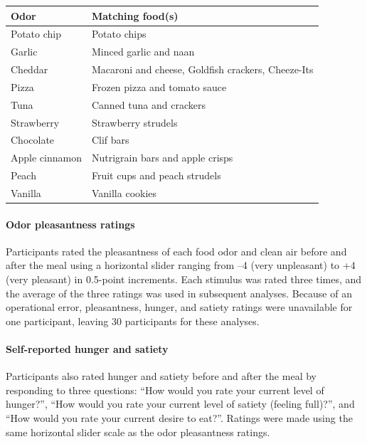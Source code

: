 \documentclass[12pt,letterpaper]{article}
\begin{document}
\label{tab:odor-food-mapping}
\small\setlength{\tabcolsep}{4pt}\begin{tabular}{p{}p{}}
\hline
\textbf{Odor} & \textbf{Matching food(s)} \\
\hline
Potato chip & Potato chips \\
Garlic & Minced garlic and naan \\
Cheddar & Macaroni and cheese, Goldfish crackers, Cheeze-Its \\
Pizza & Frozen pizza and tomato sauce \\
Tuna & Canned tuna and crackers \\
Strawberry & Strawberry strudels \\
Chocolate & Clif bars \\
Apple cinnamon & Nutrigrain bars and apple crisps \\
Peach & Fruit cups and peach strudels \\
Vanilla & Vanilla cookies \\
\hline
\end{tabular}

\par\endgroup\bigskip


\paragraph*{Odor pleasantness ratings}

Participants rated the pleasantness of each food odor and clean air before and after the meal using a horizontal slider ranging from –4 (very unpleasant) to +4 (very pleasant) in 0.5-point increments. Each stimulus was rated three times, and the average of the three ratings was used in subsequent analyses. Because of an operational error, pleasantness, hunger, and satiety ratings were unavailable for one participant, leaving 30 participants for these analyses.

\paragraph*{Self-reported hunger and satiety}

Participants also rated hunger and satiety before and after the meal by responding to three questions: “How would you rate your current level of hunger?”, “How would you rate your current level of satiety (feeling full)?”, and “How would you rate your current desire to eat?”. Ratings were made using the same horizontal slider scale as the odor pleasantness ratings.
\end{document}
